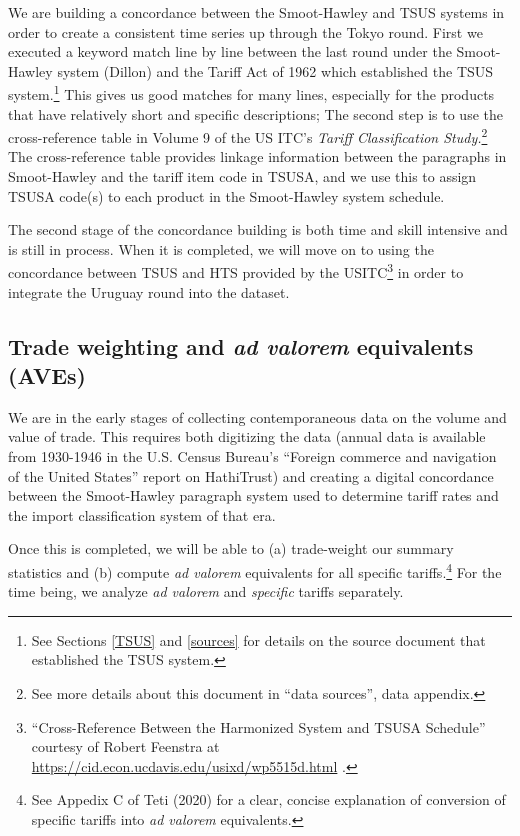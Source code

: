\documentclass[
  12pt,
]{article}
\begin{document}
We are building a concordance between the Smoot-Hawley and TSUS systems in order to create a consistent time series up through the Tokyo round. First we executed a keyword match line by line between the last round under the Smoot-Hawley system (Dillon) and the Tariff Act of 1962 which established the TSUS system.\footnote{See Sections \ref{TSUS} and \ref{sources} for details on the source document that established the TSUS system.} This gives us good matches for many lines, especially for the products that have relatively short and specific descriptions; The second step is to use the cross-reference table in Volume 9 of the US ITC's \emph{Tariff Classification Study.}\footnote{See more details about this document in ``data sources'', data appendix.} The cross-reference table provides linkage information between the paragraphs in Smoot-Hawley and the tariff item code in TSUSA, and we use this to assign TSUSA code(s) to each product in the Smoot-Hawley system schedule.

The second stage of the concordance building is both time and skill intensive and is still in process. When it is completed, we will move on to using the concordance between TSUS and HTS provided by the USITC\footnote{``Cross-Reference Between the Harmonized System and TSUSA Schedule'' courtesy of Robert Feenstra at \url{https://cid.econ.ucdavis.edu/usixd/wp5515d.html} .} in order to integrate the Uruguay round into the dataset.

\hypertarget{trade-weighting-and-ad-valorem-equivalents-aves}{%
\subsection{\texorpdfstring{Trade weighting and \emph{ad valorem} equivalents (AVEs)}{Trade weighting and ad valorem equivalents (AVEs)}}\label{trade-weighting-and-ad-valorem-equivalents-aves}}

We are in the early stages of collecting contemporaneous data on the volume and value of trade. This requires both digitizing the data (annual data is available from 1930-1946 in the U.S. Census Bureau's ``Foreign commerce and navigation of the United States'' report on HathiTrust) and creating a digital concordance between the Smoot-Hawley paragraph system used to determine tariff rates and the import classification system of that era.

Once this is completed, we will be able to (a) trade-weight our summary statistics and (b) compute \emph{ad valorem} equivalents for all specific tariffs.\footnote{See Appedix C of Teti (2020) for a clear, concise explanation of conversion of specific tariffs into \emph{ad valorem} equivalents.} For the time being, we analyze \emph{ad valorem} and \emph{specific} tariffs separately.
\end{document}
